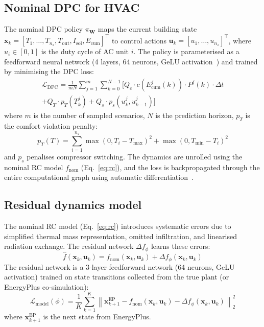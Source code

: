 \documentclass[12pt]{article}
\theoremstyle{plain}
\theoremstyle{definition}
\begin{document}
\subsection{Nominal DPC for HVAC}\label{sec:nominal_dpc}

The nominal DPC policy $\pi_{\mathbf{W}}$ maps the current building state $\mathbf{x}_k = [T_1, \ldots, T_{n_z}, T_{\text{out}}, I_{\text{sol}}, E_{\text{cum}}]^\top$ to control actions $\mathbf{u}_k = [u_1, \ldots, u_{n_z}]^\top$, where $u_i \in [0, 1]$ is the duty cycle of AC unit $i$. The policy is parameterised as a feedforward neural network (4 layers, 64 neurons, GeLU activation~\cite{hendrycks2016gelu}) and trained by minimising the DPC loss:
\begin{multline}\label{eq:dpc_loss}
\mathcal{L}_{\text{DPC}} = \frac{1}{mN} \sum_{j=1}^{m} \sum_{k=0}^{N-1} \bigl[ Q_c \cdot c(E_{\text{cum}}^j(k)) \cdot P^j(k) \cdot \Delta t \\
+ Q_T \cdot p_T(T^j_k) + Q_s \cdot p_s(u^j_k, u^j_{k-1}) \bigr]
\end{multline}
where $m$ is the number of sampled scenarios, $N$ is the prediction horizon, $p_T$ is the comfort violation penalty:
\begin{equation}
p_T(T) = \sum_{i=1}^{n_z} \max(0, T_i - T_{\max})^2 + \max(0, T_{\min} - T_i)^2
\end{equation}
and $p_s$ penalises compressor switching. The dynamics are unrolled using the nominal RC model $f_{\text{nom}}$ (Eq.~\ref{eq:rc}), and the loss is backpropagated through the entire computational graph using automatic differentiation~\cite{paszke2019pytorch}.

\subsection{Residual dynamics model}\label{sec:residual}

The nominal RC model (Eq.~\ref{eq:rc}) introduces systematic errors due to simplified thermal mass representation, omitted infiltration, and linearised radiation exchange. The residual network $\Delta f_\phi$ learns these errors:
\begin{equation}\label{eq:residual}
\hat{f}(\mathbf{x}_k, \mathbf{u}_k) = f_{\text{nom}}(\mathbf{x}_k, \mathbf{u}_k) + \Delta f_\phi(\mathbf{x}_k, \mathbf{u}_k)
\end{equation}
The residual network is a 3-layer feedforward network (64 neurons, GeLU activation) trained on state transitions collected from the true plant (or EnergyPlus co-simulation):
\begin{equation}\label{eq:model_loss}
\mathcal{L}_{\text{model}}(\phi) = \frac{1}{K}\sum_{k=1}^K \left\| \mathbf{x}_{k+1}^{\text{EP}} - f_{\text{nom}}(\mathbf{x}_k, \mathbf{u}_k) - \Delta f_\phi(\mathbf{x}_k, \mathbf{u}_k) \right\|_2^2
\end{equation}
where $\mathbf{x}_{k+1}^{\text{EP}}$ is the next state from EnergyPlus.
\end{document}
